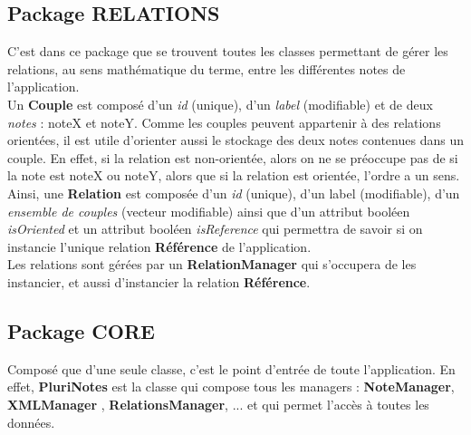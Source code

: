 \documentclass[a4paper]{report}
\begin{document}
\subsection{Package RELATIONS}
C'est dans ce package que se trouvent toutes les classes permettant de gérer les relations, au sens mathématique du terme, entre les différentes notes de l'application.\\
Un \textbf{Couple} est composé d'un \textit{id} (unique), d'un \textit{label} (modifiable) et de deux \textit{notes} : noteX et noteY. Comme les couples peuvent appartenir à des relations orientées, il est utile d'orienter aussi le stockage des deux notes contenues dans un couple. En effet, si la relation est non-orientée, alors on ne se préoccupe pas de si la note est noteX ou noteY, alors que si la relation est orientée, l'ordre a un sens.\\
Ainsi, une \textbf{Relation} est composée d'un \textit{id} (unique), d'un label (modifiable), d'un \textit{ensemble de couples} (vecteur modifiable) ainsi que d'un attribut booléen \textit{isOriented} et un attribut booléen \textit{isReference} qui permettra de savoir si on instancie l'unique relation \textbf{Référence} de l'application.\\
Les relations sont gérées par un \textbf{RelationManager} qui s'occupera de les instancier, et aussi d'instancier la relation \textbf{Référence}.

\subsection{Package CORE}
Composé que d'une seule classe, c'est le point d'entrée de toute l'application. En effet, \textbf{PluriNotes} est la classe qui compose tous les managers : \textbf{NoteManager}, \textbf{XMLManager} , \textbf{RelationsManager}, ... et qui permet l'accès à toutes les données. \\
\end{document}
